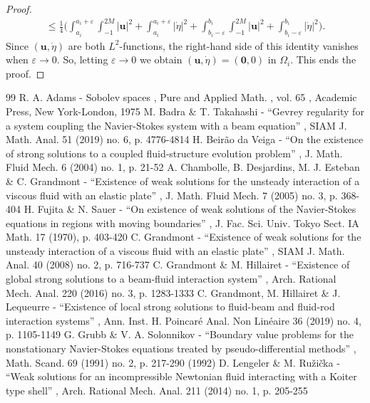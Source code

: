 \documentclass[10pt]{amsart}
\theoremstyle{remark}
\theoremstyle{definition}
\newcommand{\ug}{\boldsymbol{u}}
\newcommand{\BS}[1]{\boldsymbol{#1}}
\newcommand{\etap}{\dot{\eta}}
\begin{document}
\begin{proof}
\begin{multline}
\leq \frac{1}{4}\biggl(\int_{a_i}^{a_i+\varepsilon} \int_{-1}^{2M} \vert\ug\vert^{2}+\int_{a_i}^{a_i+\varepsilon}\vert\etap\vert^{2}
+\int_{b_i-\varepsilon}^{b_i} \int_{-1}^{2M} \vert\ug\vert^{2}+\int_{b_i-\varepsilon}^{b_i}\vert\etap\vert^{2} \biggr).
\end{multline}
Since $(\ug,\dot{\eta})$ are both $L^2$-functions, the right-hand side of this identity vanishes when $\varepsilon \to 0$. So, letting $\varepsilon\to 0$ we obtain $(\ug,\etap)=(\BS{0},0)$ in $\Omega_i$. This ends the proof.
\end{proof}


\begin{thebibliography}{99}
 R. A. Adams - Sobolev spaces , Pure and Applied Math. , vol. 65 , Academic Press, New York-London, 1975
 M. Badra \& T. Takahashi - “Gevrey regularity for a system coupling the Navier-Stokes system with a beam equation” , SIAM J. Math. Anal. 51 (2019) no. 6, p. 4776-4814
 H. Beirão da Veiga - “On the existence of strong solutions to a coupled fluid-structure evolution problem” , J. Math. Fluid Mech. 6 (2004) no. 1, p. 21-52
 A. Chambolle, B. Desjardins, M. J. Esteban \& C. Grandmont - “Existence of weak solutions for the unsteady interaction of a viscous fluid with an elastic plate” , J. Math. Fluid Mech. 7 (2005) no. 3, p. 368-404
 H. Fujita \& N. Sauer - “On existence of weak solutions of the Navier-Stokes equations in regions with moving boundaries” , J. Fac. Sci. Univ. Tokyo Sect. IA Math. 17 (1970), p. 403-420
 C. Grandmont - “Existence of weak solutions for the unsteady interaction of a viscous fluid with an elastic plate” , SIAM J. Math. Anal. 40 (2008) no. 2, p. 716-737
 C. Grandmont \& M. Hillairet - “Existence of global strong solutions to a beam-fluid interaction system” , Arch. Rational Mech. Anal. 220 (2016) no. 3, p. 1283-1333
 C. Grandmont, M. Hillairet \& J. Lequeurre - “Existence of local strong solutions to fluid-beam and fluid-rod interaction systems” , Ann. Inst. H. Poincaré Anal. Non Linéaire 36 (2019) no. 4, p. 1105-1149
 G. Grubb \& V. A. Solonnikov - “Boundary value problems for the nonstationary Navier-Stokes equations treated by pseudo-differential methods” , Math. Scand. 69 (1991) no. 2, p. 217-290 (1992)
 D. Lengeler \& M. Ružička - “Weak solutions for an incompressible Newtonian fluid interacting with a Koiter type shell” , Arch. Rational Mech. Anal. 211 (2014) no. 1, p. 205-255

\end{thebibliography}
\end{document}
